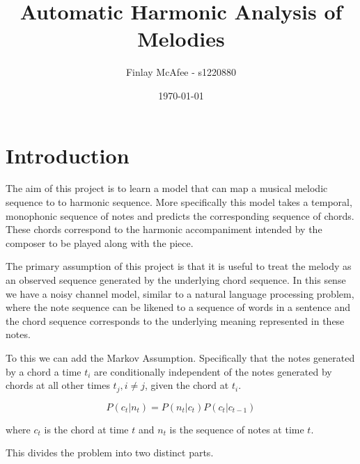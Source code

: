 \documentclass[bsc,singlespacing,parskip, deptreport]{infthesis}
\begin{document}
\title{Automatic Harmonic Analysis of Melodies}

\author{Finlay McAfee - s1220880}


\date{\today}


\maketitle


\chapter{Introduction}
The aim of this project is to learn a model that can map a musical melodic sequence to to harmonic sequence. More specifically this model takes a temporal, monophonic sequence of notes and predicts the corresponding sequence of chords. These chords correspond to the harmonic accompaniment intended by the composer to be played along with the piece.

The primary assumption of this project is that it is useful to treat the melody as an observed sequence generated by the underlying chord sequence. In this sense we have a noisy channel model, similar to a natural language processing problem, where the note sequence can be likened to a sequence of words in a sentence and the chord sequence corresponds to the underlying meaning represented in these notes.

To this we can add the Markov Assumption. Specifically that the notes generated by a chord a time $t_i$ are conditionally independent of the notes generated by chords at all other times $t_j, i \neq j$, given the chord at $t_i$.

\begin{equation} \label{eq1}
P(c_t | n_t) = P(n_t | c_t) P(c_t | c_{t-1})
\end{equation}

where $c_t$ is the chord at time $t$ and $n_t$ is the sequence of notes at time $t$.

This divides the problem into two distinct parts.
\end{document}
